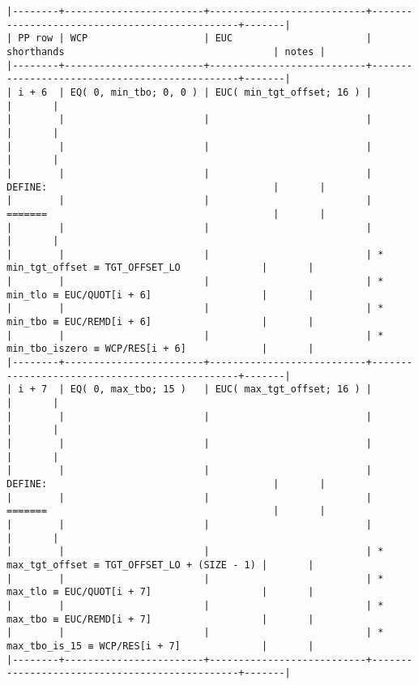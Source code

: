 \documentclass[varwidth=\maxdimen,margin=0.5cm,multi={verbatim}]{standalone}
\begin{document}
\begin{verbatim}
|--------+------------------------+---------------------------+-----------------------------------------------+-------|
| PP row | WCP                    | EUC                       | shorthands                                    | notes |
|--------+------------------------+---------------------------+-----------------------------------------------+-------|
| i + 6  | EQ( 0, min_tbo; 0, 0 ) | EUC( min_tgt_offset; 16 ) |                                               |       |
|        |                        |                           |                                               |       |
|        |                        |                           |                                               |       |
|        |                        |                           | DEFINE:                                       |       |
|        |                        |                           | =======                                       |       |
|        |                        |                           |                                               |       |
|        |                        |                           | * min_tgt_offset ≡ TGT_OFFSET_LO              |       |
|        |                        |                           | * min_tlo ≡ EUC/QUOT[i + 6]                   |       |
|        |                        |                           | * min_tbo ≡ EUC/REMD[i + 6]                   |       |
|        |                        |                           | * min_tbo_iszero ≡ WCP/RES[i + 6]             |       |
|--------+------------------------+---------------------------+-----------------------------------------------+-------|
| i + 7  | EQ( 0, max_tbo; 15 )   | EUC( max_tgt_offset; 16 ) |                                               |       |
|        |                        |                           |                                               |       |
|        |                        |                           |                                               |       |
|        |                        |                           | DEFINE:                                       |       |
|        |                        |                           | =======                                       |       |
|        |                        |                           |                                               |       |
|        |                        |                           | * max_tgt_offset ≡ TGT_OFFSET_LO + (SIZE - 1) |       |
|        |                        |                           | * max_tlo ≡ EUC/QUOT[i + 7]                   |       |
|        |                        |                           | * max_tbo ≡ EUC/REMD[i + 7]                   |       |
|        |                        |                           | * max_tbo_is_15 ≡ WCP/RES[i + 7]              |       |
|--------+------------------------+---------------------------+-----------------------------------------------+-------|


\end{verbatim}
\end{document}
